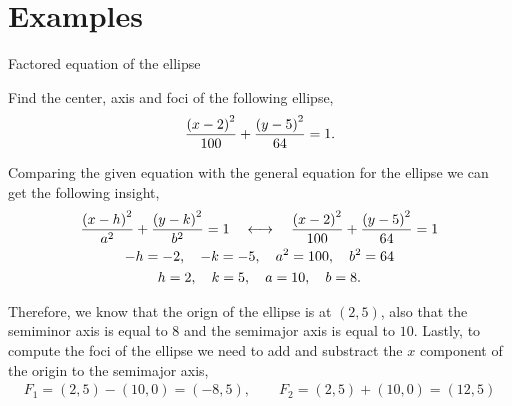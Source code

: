 \documentclass[../main-exe.tex]{subfiles}
\begin{document}
\section{Examples}

\begin{example}{Factored equation of the ellipse}{~}

Find the center, axis and foci of the following ellipse, 
\begin{gather*}
    \frac{\qty(x-2)^2}{100} + \frac{\qty(y-5)^2}{64} = 1.
\end{gather*}

Comparing the given equation with the general equation for the ellipse we can get the following insight,
\begin{gather*}
    \frac{\qty(x-h)^2}{a^2} + \frac{\qty(y-k)^2}{b^2} = 1\quad\longleftrightarrow\quad\frac{\qty(x-2)^2}{100} + \frac{\qty(y-5)^2}{64} = 1 \\
    -h = -2,\quad -k=-5,\quad a^2 = 100,\quad b^2 = 64 \\
    h = 2,\quad k=5, \quad a = 10,\quad b=8.
\end{gather*}

Therefore, we know that the orign of the ellipse is at $(2,5)$, also that the semiminor axis is equal to $8$ and the semimajor axis is equal to $10$.
Lastly, to compute the foci of the ellipse we need to add and substract the $x$ component of the origin to the semimajor axis,
\begin{gather*}
    F_1 = (2,5) - (10,0) = (-8,5),\qquad F_2 = (2,5) + (10,0) = (12,5)
\end{gather*}

\end{example}
\end{document}
